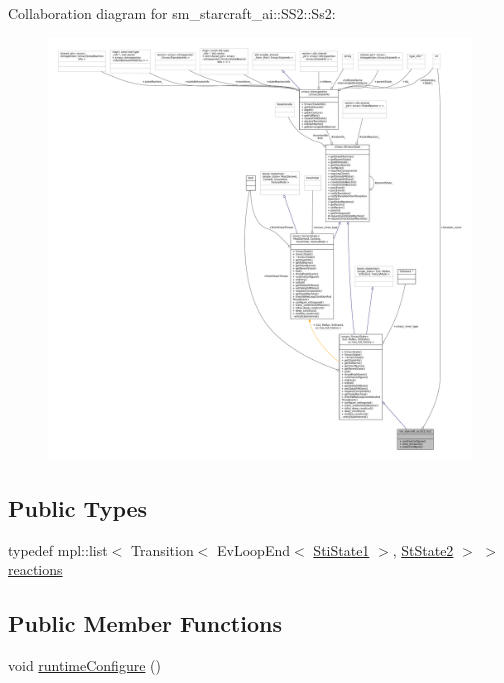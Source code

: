 Collaboration diagram for sm\+\_\+starcraft\+\_\+ai\+:\+:S\+S2\+:\+:Ss2\+:
\nopagebreak
\begin{figure}[H]
\begin{center}
\leavevmode
\includegraphics[width=350pt]{structsm__starcraft__ai_1_1SS2_1_1Ss2__coll__graph}
\end{center}
\end{figure}
\subsection*{Public Types}
\begin{DoxyCompactItemize}
\item 
typedef mpl\+::list$<$ Transition$<$ Ev\+Loop\+End$<$ \hyperlink{structsm__starcraft__ai_1_1inner__states_1_1StiState1}{Sti\+State1} $>$, \hyperlink{structsm__starcraft__ai_1_1StState2}{St\+State2} $>$ $>$ \hyperlink{structsm__starcraft__ai_1_1SS2_1_1Ss2_ac73b072e52e6096da6f2ad200645d6b9}{reactions}
\end{DoxyCompactItemize}
\subsection*{Public Member Functions}
\begin{DoxyCompactItemize}
\item 
void \hyperlink{structsm__starcraft__ai_1_1SS2_1_1Ss2_a0bcc95512a28c67dd1e1b8f6910932f8}{runtime\+Configure} ()
\end{DoxyCompactItemize}
